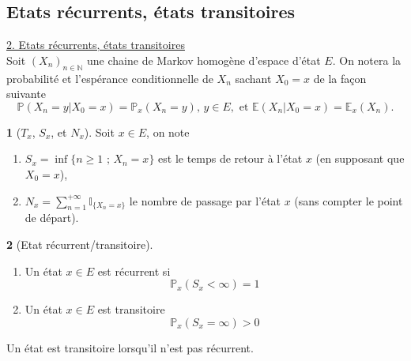 \documentclass[8pt,notheorems]{beamer}
\def \N{\mathbb N}
\theoremstyle{definition}
\newtheorem{definition}{\translate{Definition}}
\theoremstyle{example}
\theoremstyle{mystyle}
\theoremstyle{plain}
\begin{document}
\subsection{Etats récurrents, états transitoires}
\begin{frame}[allowframebreaks]
\underline{2. Etats récurrents, états transitoires}\\
Soit $(X_{n})_{n\in\N}$ une chaine de Markov homogène d'espace d'état $E$. On notera la probabilité et l'espérance conditionnelle de $X_n$ sachant $X_0=x$ de la façon suivante
$$
\mathbb{P}(X_n=y|X_0=x)=\mathbb{P}_{x}(X_n=y)\text{, }y\in E,\text{ et }\mathbb{E}(X_n|X_0=x)=\mathbb{E}_{x}(X_n).
$$
\begin{definition}[$T_x$, $S_x$, et $N_x$]
Soit $x\in E$, on note
\begin{enumerate}
\item $S_x=\inf\{n\geq 1\text{ ; }X_n=x\}$ est le temps de retour à l'état $x$ (en supposant que $X_0=x$),
\item $N_x=\sum_{n=1}^{+\infty}\mathbb{I}_{\{X_n=x\}}$ le nombre de passage par l'état $x$ (sans compter le point de départ).
\end{enumerate}
\end{definition}
\begin{definition}[Etat récurrent/transitoire]
\begin{enumerate}
\item Un état $x\in E$ est récurrent si
$$
\mathbb{P}_x(S_x<\infty)=1
$$
\item Un état $x\in E$ est transitoire
$$
\mathbb{P}_x(S_x=\infty)>0
$$
\end{enumerate}
Un état est transitoire lorsqu'il n'est pas récurrent.
\end{definition}
\end{frame}
\end{document}
